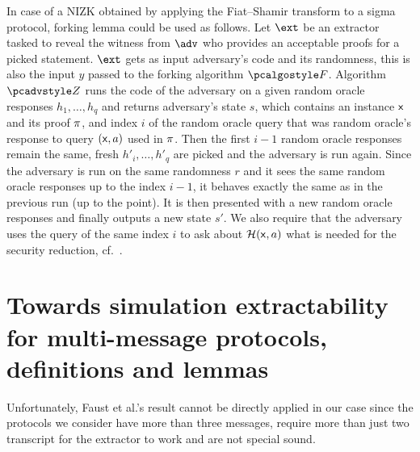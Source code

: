 \let\accentvec\vec \documentclass[runningheads]{llncs}
\begin{document}
In case of a NIZK obtained by applying the Fiat--Shamir transform to a sigma protocol, forking lemma could be used as follows.
Let $\ext$ be an extractor tasked to reveal the witness from $\adv$ who
provides an acceptable proofs for a picked statement. $\ext$ gets as input adversary's
code and its randomness, this is also the input $y$ passed to the forking
algorithm $\forking$. Algorithm $\zdv$ runs the code of the adversary on a
given random oracle responses $h_1, \ldots, h_q$ and returns adversary's
state $s$, which contains an instance $\mathsf{x}$ and its proof $\pi$, and index $i$ of the random oracle query that was random oracle's
response to query $(\mathsf{x}, a)$ used in $\pi$. Then the first $i - 1$
random oracle responses remain the same, fresh $h'_i, \ldots, h'_q$ are
picked and the adversary is run again. Since the adversary is run on the same
randomness $r$ and it sees the same random oracle responses up to the index $i
- 1$, it behaves exactly the same as in the previous run (up to the point). It
is then presented with a new random oracle responses and finally outputs a new
state $s'$. We also require that the adversary uses the query of the same
index $i$ to ask about $\mathcal{H}(\mathsf{x}, a)$ what is needed for the security
reduction, cf.~\cite{CCS:BelNev06}.


\section{Towards simulation extractability for multi-message
protocols, definitions and lemmas}
Unfortunately, Faust et al.'s result cannot be directly applied in our case
since the protocols we consider have more than three messages,
require more than just two transcript for the extractor to work and are not special sound.
\end{document}
